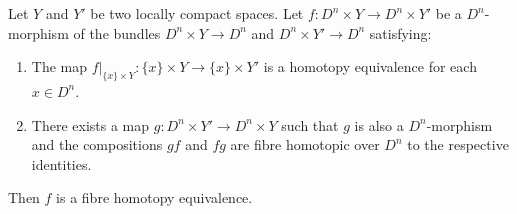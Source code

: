 Let $Y$ and $Y'$ be two locally compact spaces. Let $f: D^n \times Y \rightarrow D^n \times Y'$ be a $D^n$-morphism of the bundles $D^n \times Y \rightarrow D^n$ and $D^n \times Y' \rightarrow D^n$ satisfying:
\begin{enumerate}
\item[(1)] The map $f|_{\{x\} \times Y}: \{x\} \times Y \rightarrow \{x\} \times Y'$ is a homotopy equivalence for each $x \in D^n$.
\item[(2)] There exists a map $g: D^n \times Y' \rightarrow D^n \times Y$ such that $g$ is also a $D^n$-morphism and the compositions $gf$ and $fg$ are fibre homotopic over $D^n$ to the respective identities.
\end{enumerate}
Then $f$ is a fibre homotopy equivalence.
